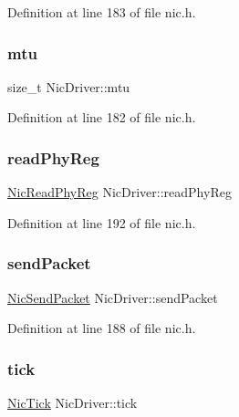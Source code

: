 Definition at line 183 of file nic.\+h.

\mbox{\label{structNicDriver_a8236221ef7d5a0a7fbcdae57374df759}} 
\subsubsection{\texorpdfstring{mtu}{mtu}}
{\footnotesize\ttfamily size\+\_\+t Nic\+Driver\+::mtu}



Definition at line 182 of file nic.\+h.

\mbox{\label{structNicDriver_a391490ad2030e1e8debdede59084c8ad}} 
\subsubsection{\texorpdfstring{read\+Phy\+Reg}{readPhyReg}}
{\footnotesize\ttfamily \hyperlink{nic_8h_a0d400b31f6491d5bdb45075c389fac19}{Nic\+Read\+Phy\+Reg} Nic\+Driver\+::read\+Phy\+Reg}



Definition at line 192 of file nic.\+h.

\mbox{\label{structNicDriver_aded5f78ab18f7b2f1e65313434efafb9}} 
\subsubsection{\texorpdfstring{send\+Packet}{sendPacket}}
{\footnotesize\ttfamily \hyperlink{nic_8h_a63d88efa567d89b00e11faebabafa2e0}{Nic\+Send\+Packet} Nic\+Driver\+::send\+Packet}



Definition at line 188 of file nic.\+h.

\mbox{\label{structNicDriver_a52cde3c20cfb4cf96d404c683596492a}} 
\subsubsection{\texorpdfstring{tick}{tick}}
{\footnotesize\ttfamily \hyperlink{nic_8h_a3f6714321f4ab9564fdac42ba69de526}{Nic\+Tick} Nic\+Driver\+::tick}




